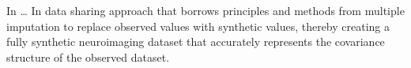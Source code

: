 In \citep{Lorenzi2019} \ldots
In \citep{Vaden2020} data sharing approach that borrows principles and methods from multiple imputation to replace observed values with synthetic values, thereby creating a fully synthetic neuroimaging dataset that accurately represents the covariance structure of the observed dataset. 
%
%
%

